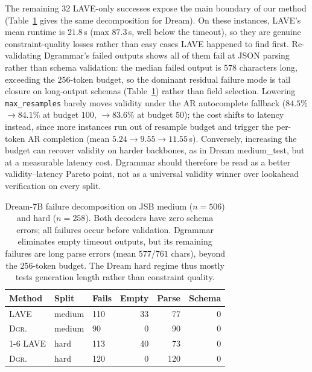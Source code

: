 \documentclass[11pt]{article}
\begin{document}
The remaining 32 LAVE-only successes expose the main boundary of our method (Table~\ref{tab:dream-fail} gives the same decomposition for Dream). On these instances, LAVE's mean runtime is $21.8$\,s (max $87.3$\,s, well below the timeout), so they are genuine constraint-quality losses rather than easy cases LAVE happened to find first. Re-validating Dgrammar's failed outputs shows all of them fail at JSON parsing rather than schema validation: the median failed output is $578$ characters long, exceeding the $256$-token budget, so the dominant residual failure mode is tail closure on long-output schemas (Table~\ref{tab:dream-fail}) rather than field selection. Lowering \texttt{max\_resamples} barely moves validity under the AR autocomplete fallback ($84.5$\%$\!\to\!84.1$\% at budget $100$, $\!\to\!83.6$\% at budget $50$); the cost shifts to latency instead, since more instances run out of resample budget and trigger the per-token AR completion (mean $5.24\!\to\!9.55\!\to\!11.55$\,s). Conversely, increasing the budget can recover validity on harder backbones, as in Dream medium\_test, but at a measurable latency cost. Dgrammar should therefore be read as a better validity--latency Pareto point, not as a universal validity winner over lookahead verification on every split.

\begin{table}[!t]
\small
\centering
\setlength{\tabcolsep}{4pt}
\begin{tabular}{lllrrr}
\toprule
\textbf{Method} & \textbf{Split} & \textbf{Fails} & \textbf{Empty} & \textbf{Parse} & \textbf{Schema} \\
\midrule
LAVE   & medium & 110 & 33 & 77 & 0 \\
\textsc{Dgr.} & medium & 90  & 0  & 90 & 0 \\
\cmidrule(lr){1-6}
LAVE   & hard   & 113 & 40 & 73 & 0 \\
\textsc{Dgr.} & hard   & 120 & 0  & 120 & 0 \\
\bottomrule
\end{tabular}
\caption{Dream-7B failure decomposition on JSB medium ($n{=}506$) and hard ($n{=}258$). Both decoders have zero schema errors; all failures occur before validation. Dgrammar eliminates empty timeout outputs, but its remaining failures are long parse errors (mean $577$/$761$ chars), beyond the $256$-token budget. The Dream hard regime thus mostly tests generation length rather than constraint quality.}
\label{tab:dream-fail}
\end{table}
\end{document}
